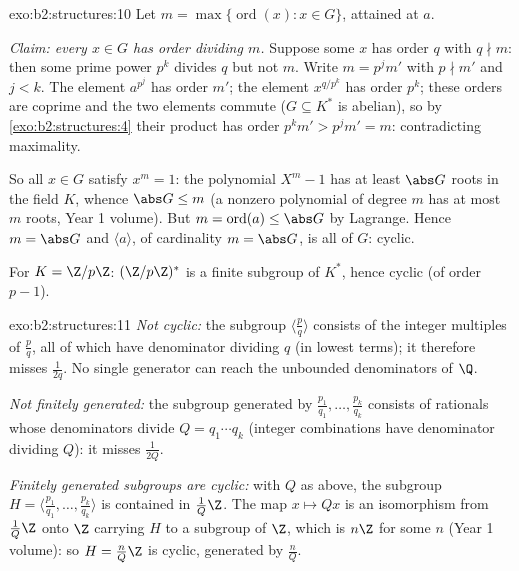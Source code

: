 \begin{solution}{exo:b2:structures:10}
Let $m = \max\{\operatorname{ord}(x) : x \in G\}$, attained at $a$.

\emph{Claim: every $x \in G$ has order dividing $m$.} Suppose some
$x$ has order $q$ with $q \nmid m$: then some prime power $p^k$
divides $q$ but not $m$. Write $m = p^j m'$ with $p \nmid m'$ and $j
< k$. The element $a^{p^j}$ has order $m'$; the element
$x^{q/p^k}$ has order $p^k$; these orders are coprime and the two
elements commute ($G \subseteq K^*$ is abelian), so by
\cref{exo:b2:structures:4} their product has order $p^k m' > p^j m'
= m$: contradicting maximality.

So all $x \in G$ satisfy $x^m = 1$: the polynomial $X^m - 1$ has at
least $\abs G$ roots in the field $K$, whence $\abs G \leq m$
(a nonzero polynomial of degree $m$ has at most $m$ roots, Year 1
volume). But $m = \operatorname{ord}(a) \leq \abs G$ by Lagrange.
Hence $m = \abs G$ and $\langle a \rangle$, of cardinality $m =
\abs G$, is all of $G$: cyclic.

For $K = \Z/p\Z$: $(\Z/p\Z)^*$ is a finite subgroup of $K^*$, hence
cyclic (of order $p - 1$).
\end{solution}

\begin{solution}{exo:b2:structures:11}
\emph{Not cyclic:} the subgroup $\langle \frac pq\rangle$ consists
of the integer multiples of $\frac pq$, all of which have
denominator dividing $q$ (in lowest terms); it therefore misses
$\frac{1}{2q}$. No single generator can reach the unbounded
denominators of $\Q$.

\emph{Not finitely generated:} the subgroup generated by
$\frac{p_1}{q_1}, \dots, \frac{p_k}{q_k}$ consists of rationals
whose denominators divide $Q = q_1 \cdots q_k$ (integer combinations
have denominator dividing $Q$): it misses $\frac{1}{2Q}$.

\emph{Finitely generated subgroups are cyclic:} with $Q$ as above,
the subgroup $H = \langle \frac{p_1}{q_1}, \dots,
\frac{p_k}{q_k}\rangle$ is contained in $\frac{1}{Q}\Z$. The map $x
\mapsto Qx$ is an isomorphism from $\frac1Q\Z$ onto $\Z$ carrying
$H$ to a subgroup of $\Z$, which is $n\Z$ for some $n$ (Year 1
volume): so $H = \frac{n}{Q}\Z$ is cyclic, generated by
$\frac nQ$.
\end{solution}

